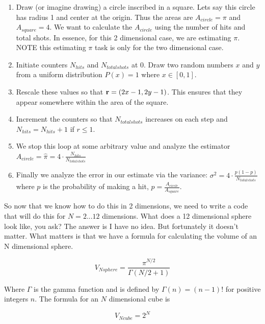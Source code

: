 \documentclass[11pt]{amsart}
\begin{document}
\begin{enumerate}
\item Draw (or imagine drawing) a circle inscribed in a square. Lets say this circle has radius 1 and center at the origin.  Thus the areas are $A_{circle}=\pi$ and $A_{square}=4$.  We want to calculate the $A_{circle}$ using the number of hits and total shots.  In essence, for this 2 dimensional case, we are estimating $\pi$.   NOTE this estimating $\pi$ task is only for the two dimensional case.
\item Initiate counters $N_{hits}$ and $N_{total shots}$ at $0$.  Draw two random numbers $x$ and $y$ from a uniform distribution $P(x)=1$ where $x \in [0,1]$.  
\item Rescale these values so that $\textbf r =(2x-1,2y-1)$.  This ensures that they appear somewhere within the area of the square.
\item Increment the counters so that $N_{total shots}$ increases on each step and $N_{hits}=N_{hits}+1$ if $r \leq 1$.
\item We stop this loop at some arbitrary value and analyze the estimator $A_{circle} = \hat \pi = 4 \cdot \frac {N_{hits}} {N_{total shots}}$
\item Finally we analyze the error in our estimate via the variance: \newline $\sigma ^2 = 4 \cdot \frac{p (1-p)}{N_{totalshots}}$ where $p$ is the probability of making a hit, $p=\frac{A_{circle}}{A_{square}}$.
\end{enumerate}


So now that we know how to do this in 2 dimensions, we need to write a code that will do this for $N=2...12$ dimensions.  What does a 12 dimensional sphere look like, you ask?  The answer is I have no idea.  But fortunately it doesn't matter.  What matters is that we have a formula for calculating the volume of an N dimensional sphere.

\begin{equation}
V_{Nsphere} = \frac {\pi ^{N/2}} {\Gamma (N/2+1)}
\end{equation}
\vspace{5 mm}

Where $\Gamma$ is the gamma function and is defined by $\Gamma(n)=(n-1)!$ for positive integers $n$.  The formula for an $N$ dimensional cube is 

\begin{equation}
V_{Ncube}=2^N
\end{equation}
\vspace{5 mm}
\end{document}
